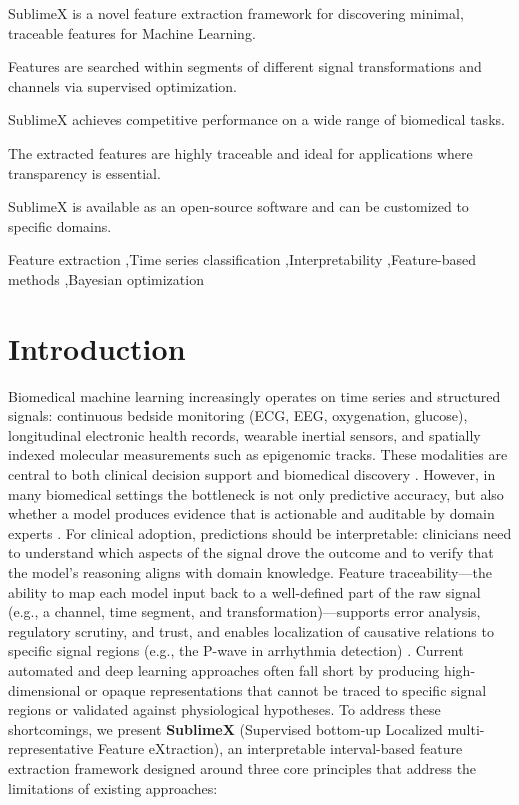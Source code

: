 \documentclass[times, review, 10pt]{elsarticle}
\begin{document}
\begin{frontmatter}
\begin{highlights}
\item SublimeX is a novel feature extraction framework for discovering minimal, traceable features for Machine Learning.
\item Features are searched within segments of different signal transformations and channels via supervised optimization.
\item SublimeX achieves competitive performance on a wide range of biomedical tasks.
\item The extracted features are highly traceable and ideal for applications where transparency is essential.
\item SublimeX is available as an open-source software and can be customized to specific domains.
\end{highlights}

\begin{keyword}
Feature extraction \sep Time series classification \sep Interpretability
\sep Feature-based methods \sep Bayesian optimization

\end{keyword}

\end{frontmatter}


\section{Introduction}
Biomedical machine learning increasingly operates on time series and structured signals: continuous bedside monitoring (ECG, EEG, oxygenation, glucose),
longitudinal electronic health records, wearable inertial sensors, and spatially indexed molecular measurements such as epigenomic tracks.
These modalities are central to both clinical decision support and biomedical discovery \cite{morid2023time, patharkar2024predictive}.
However, in many biomedical settings the bottleneck is not only predictive accuracy, but also whether a model produces evidence that is actionable and
auditable by domain experts \cite{tonekaboni2019clinicians, rudin2019stop}. For clinical adoption, predictions should be interpretable: clinicians need to
understand which aspects of the signal drove the outcome and to verify that the model's reasoning aligns with domain knowledge. Feature traceability---the
ability to map each model input back to a well-defined part of the raw signal (e.g., a channel, time segment, and transformation)---supports error
analysis, regulatory scrutiny, and trust, and enables localization of causative relations to specific signal regions (e.g., the P-wave in arrhythmia
detection) \cite{pantelidis2025ecgxplain}. Current automated and deep learning approaches often fall short by producing
high-dimensional or opaque representations that cannot be traced to specific signal regions or validated against physiological hypotheses. To address these shortcomings, we
present \textbf{SublimeX} (Supervised bottom-up Localized multi-representative Feature eXtraction), an interpretable interval-based feature extraction framework designed around three core principles that address the
limitations of existing approaches:
\end{document}
